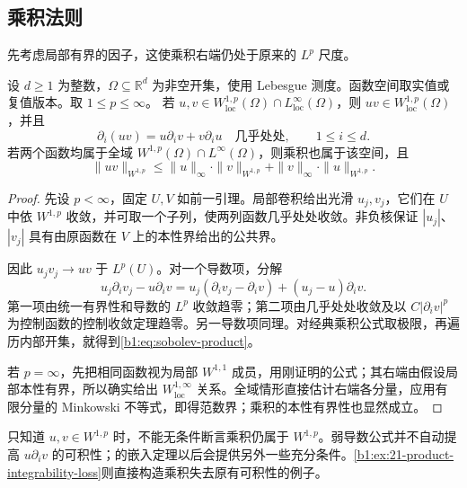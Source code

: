 \subsection{乘积法则}
\label{b1:subsec:210301}

先考虑局部有界的因子，这使乘积右端仍处于原来的 \(L^p\) 尺度。

\begin{proposition}[Leibniz]\label{b1:prop:sobolev-product}
设 \(d\geq1\) 为整数，\(\Omega\subseteq\mathbb R^d\) 为非空开集，使用 Lebesgue 测度。函数空间取实值或复值版本。取 \(1\leq p\leq\infty\)。
若 \(u,v\in W^{1,p}_{\mathrm{loc}}(\Omega)\cap L^\infty_{\mathrm{loc}}(\Omega)\)，则 \(uv\in W^{1,p}_{\mathrm{loc}}(\Omega)\)，并且
\begin{equation}\label{b1:eq:sobolev-product}
 \partial_i(uv)=u\partial_i v+v\partial_i u
 \quad\text{几乎处处},\qquad 1\le i\le d.
\end{equation}
若两个函数均属于全域 \(W^{1,p}(\Omega)\cap L^\infty(\Omega)\)，则乘积也属于该空间，且
\[
 \|uv\|_{W^{1,p}}
 \le\|u\|_\infty\cdot\|v\|_{W^{1,p}}
      +\|v\|_\infty\cdot\|u\|_{W^{1,p}}.
\]
\end{proposition}
\begin{proof}
先设 \(p<\infty\)，固定 \(U,V\) 如前一引理。局部卷积给出光滑 \(u_j,v_j\)，它们在 \(U\) 中依 \(W^{1,p}\) 收敛，并可取一个子列，使两列函数几乎处处收敛。非负核保证 \(|u_j|\)、\(|v_j|\) 具有由原函数在 \(V\) 上的本性界给出的公共界。

因此 \(u_jv_j\to uv\) 于 \(L^p(U)\)。对一个导数项，分解
\[
 u_j\partial_i v_j-u\partial_i v
 =u_j(\partial_i v_j-\partial_i v)
   +(u_j-u)\partial_i v.
\]
第一项由统一有界性和导数的 \(L^p\) 收敛趋零；第二项由几乎处处收敛及以 \(C|\partial_i v|^p\) 为控制函数的控制收敛定理趋零。另一导数项同理。对经典乘积公式取极限，再遍历内部开集，就得到\eqref{b1:eq:sobolev-product}。

若 \(p=\infty\)，先把相同函数视为局部 \(W^{1,1}\) 成员，用刚证明的公式；其右端由假设局部本性有界，所以确实给出 \(W^{1,\infty}_{\mathrm{loc}}\) 关系。全域情形直接估计右端各分量，应用有限分量的 Minkowski 不等式，即得范数界；乘积的本性有界性也显然成立。
\end{proof}

只知道 \(u,v\in W^{1,p}\) 时，不能无条件断言乘积仍属于 \(W^{1,p}\)。弱导数公式并不自动提高 \(u\partial_i v\) 的可积性；的嵌入定理以后会提供另外一些充分条件。\cref{b1:ex:21-product-integrability-loss}则直接构造乘积失去原有可积性的例子。

\ProseParagraphBreak

